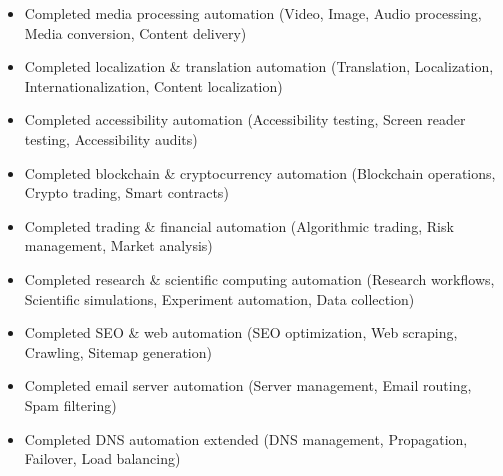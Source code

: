 \documentclass[11pt,a4paper]{article}
\begin{document}
\begin{itemize}
\item Completed media processing automation (Video, Image, Audio processing, Media conversion, Content delivery)
\end{itemize}

\begin{itemize}
\item Completed localization & translation automation (Translation, Localization, Internationalization, Content localization)
\end{itemize}

\begin{itemize}
\item Completed accessibility automation (Accessibility testing, Screen reader testing, Accessibility audits)
\end{itemize}

\begin{itemize}
\item Completed blockchain & cryptocurrency automation (Blockchain operations, Crypto trading, Smart contracts)
\end{itemize}

\begin{itemize}
\item Completed trading & financial automation (Algorithmic trading, Risk management, Market analysis)
\end{itemize}

\begin{itemize}
\item Completed research & scientific computing automation (Research workflows, Scientific simulations, Experiment automation, Data collection)
\end{itemize}

\begin{itemize}
\item Completed SEO & web automation (SEO optimization, Web scraping, Crawling, Sitemap generation)
\end{itemize}

\begin{itemize}
\item Completed email server automation (Server management, Email routing, Spam filtering)
\end{itemize}

\begin{itemize}
\item Completed DNS automation extended (DNS management, Propagation, Failover, Load balancing)
\end{itemize}
\end{document}
